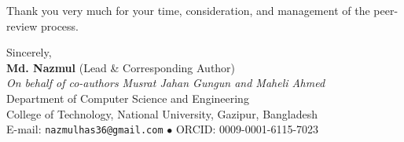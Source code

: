 \documentclass[11pt,a4paper]{article}
\begin{document}
\noindent
Thank you very much for your time, consideration, and management of the peer-review process.

\vspace{0.6cm}

\noindent
Sincerely,\\
\textbf{Md. Nazmul} (Lead \& Corresponding Author)\\
\textit{On behalf of co-authors Musrat Jahan Gungun and Maheli Ahmed}\\
Department of Computer Science and Engineering\\
College of Technology, National University, Gazipur, Bangladesh\\
E-mail: \texttt{nazmulhas36@gmail.com} $\bullet$ ORCID: 0009-0001-6115-7023
\end{document}
